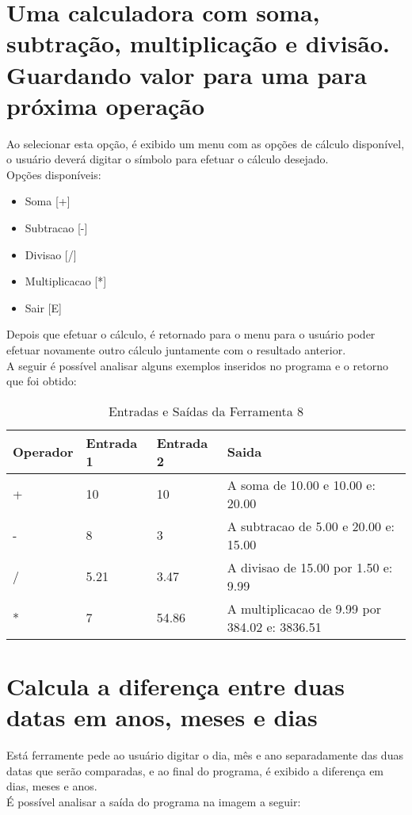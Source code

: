 \documentclass[12pt]{article}
\begin{document}
\newpage

\section{Uma calculadora com soma, subtração, multiplicação e divisão. Guardando valor para uma para próxima operação}
Ao selecionar esta opção, é exibido um menu com as opções de cálculo disponível, o usuário deverá digitar o símbolo para efetuar o cálculo desejado. \\
Opções disponíveis:
\begin{itemize}
\item Soma [+]
\item Subtracao [-]
\item Divisao [/]
\item Multiplicacao [*]
\item Sair [E]
\end{itemize}
Depois que efetuar o cálculo, é retornado para o menu para o usuário poder efetuar novamente outro cálculo juntamente com o resultado anterior. \\
A seguir é possível analisar alguns exemplos inseridos no programa e o retorno que foi obtido:

\FloatBarrier
\begin{table}[ht]
\centering
\begin{tabular}{|l|l|l|l|}
\hline
\textbf{Operador} & \textbf{Entrada 1} & \textbf{Entrada 2} & \textbf{Saida}\\
\hline
+ & 10 & 10 & A soma de 10.00 e 10.00 e: 20.00 \\
- & 8 & 3 & A subtracao de 5.00 e 20.00 e: 15.00 \\
/ & 5.21 & 3.47 & A divisao de 15.00 por 1.50 e: 9.99 \\
* & 7 & 54.86 & A multiplicacao de 9.99 por 384.02 e: 3836.51 \\

\hline
\end{tabular}
\caption{Entradas e Saídas da Ferramenta 8}
\end{table} 

\newpage

\section{Calcula a diferença entre duas datas em anos, meses e dias}
Está ferramente pede ao usuário digitar o dia, mês e ano separadamente das duas datas que serão comparadas, e ao final do programa, é exibido a diferença em dias, meses e anos. \\
É possível analisar a saída do programa na imagem a seguir:
\end{document}
